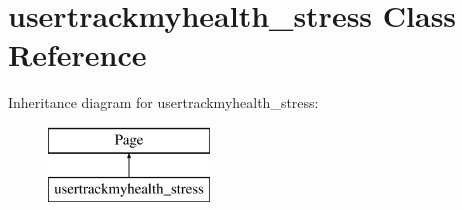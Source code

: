 \hypertarget{classusertrackmyhealth__stress}{\section{usertrackmyhealth\-\_\-stress Class Reference}
\label{classusertrackmyhealth__stress}
}
Inheritance diagram for usertrackmyhealth\-\_\-stress\-:\begin{figure}[H]
\begin{center}
\leavevmode
\includegraphics[height=2.000000cm]{classusertrackmyhealth__stress}
\end{center}
\end{figure}
